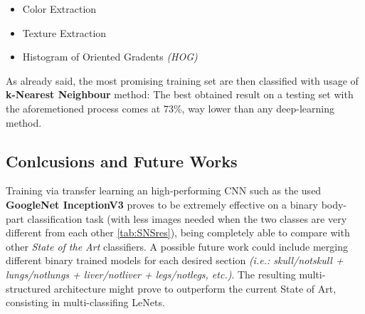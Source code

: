 \documentclass[../main.tex]{subfiles}
\begin{document}
\begin{itemize}
	\item Color Extraction
	\item Texture Extraction
	\item Histogram of Oriented Gradents \textit{(HOG)}
\end{itemize}
As already said, the most promising training set are then classified with usage of \textbf{k-Nearest Neighbour} method: The best obtained result on a testing set with the aforemetioned process comes at 73\%, way lower than any deep-learning method.
\vspace{5mm}
\subsection{Conlcusions and Future Works}
Training via transfer learning an high-performing CNN such as the used \textbf{GoogleNet InceptionV3} proves to be extremely effective on a binary body-part classification task (with less images needed when the two classes are very different from each other \ref{tab:SNSres}), being completely able to compare with other \textit{State of the Art} classifiers. A possible future work could include merging different binary trained models for each desired section \textit{(i.e.: skull/notskull + lungs/notlungs + liver/notliver + legs/notlegs, etc.)}. The resulting multi-structured architecture might prove to outperform the current State of Art, consisting in multi-classifing LeNets.
\end{document}
